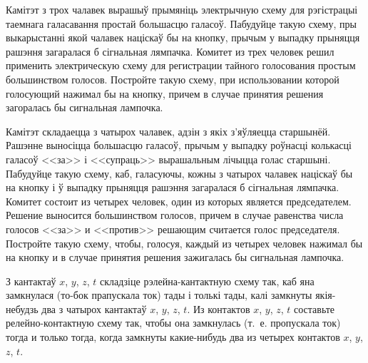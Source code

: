 \begin{problemList}
\smallskip

\problemItemSimple
{Камітэт з трох чалавек вырашыў прымяніць электрычную схему для рэгістрацыі таемнага галасавання простай большасцю галасоў. Пабудуйце такую схему, пры выкарыстанні якой чалавек націскаў бы на кнопку, прычым у выпадку прыняцця рашэння загаралася б сігнальная лямпачка.}
{Комитет из трех человек решил применить электрическую схему для регистрации тайного голосования простым большинством голосов. Постройте такую схему, при использовании которой голосующий нажимал бы на кнопку, причем в случае принятия решения загоралась бы сигнальная лампочка.}

\bigskip

\problemItemSimple
{Камітэт складаецца з чатырох чалавек, адзін з якіх з'яўляецца старшынёй. Рашэнне выносіцца большасцю галасоў, прычым у выпадку роўнасці колькасці галасоў <<за>> і <<супраць>> вырашальным лічыцца голас старшыні. Пабудуйце такую схему, каб, галасуючы, кожны з чатырох чалавек націскаў бы на кнопку і ў выпадку прыняцця рашэння загаралася б сігнальная лямпачка.}
{Комитет состоит из четырех человек, один из которых является председателем. Решение выносится большинством голосов, причем в случае равенства числа голосов <<за>> и <<против>> решающим считается голос председателя. Постройте такую схему, чтобы, голосуя, каждый из четырех человек нажимал бы на кнопку и в случае принятия решения зажигалась бы сигнальная лампочка.}

 \bigskip

 \problemItemSimple
 {З кантактаў $x$, $y$, $z$, $t$ складзіце рэлейна-кантактную схему так, каб яна замкнулася (то-бок прапускала ток) тады і толькі тады, калі замкнуты якія-небудзь два з чатырох кантактаў $x$, $y$, $z$, $t$.}
 {Из контактов $x$, $y$, $z$, $t$ составьте релейно-контактную схему так, чтобы она замкнулась (т.~е. пропускала ток) тогда и только тогда, когда замкнуты какие-нибудь два из четырех контактов $x$, $y$, $z$, $t$.}

\end{problemList}



